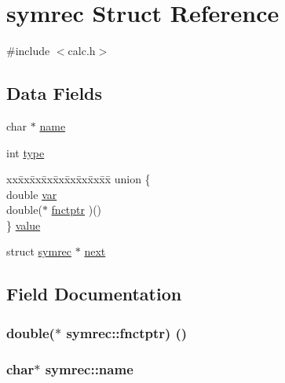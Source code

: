 \hypertarget{structsymrec}{}\section{symrec Struct Reference}
\label{structsymrec}


{\ttfamily \#include $<$calc.\+h$>$}

\subsection*{Data Fields}
\begin{DoxyCompactItemize}
\item 
char $\ast$ \hyperlink{structsymrec_a13b3ddedd56ed8a393dfd4b266bb81e1}{name}
\item 
int \hyperlink{structsymrec_a3ed0bae32ad0e16423a49153484094f8}{type}
\item 
\begin{tabbing}
xx\=xx\=xx\=xx\=xx\=xx\=xx\=xx\=xx\=\kill
union \{\\
\>double \hyperlink{structsymrec_af3db0c7e569f93a9d7385d5b170578f8}{var}\\
\>double($\ast$ \hyperlink{structsymrec_accae313254c71fad5d7eb0446473bec5}{fnctptr} )()\\
\} \hyperlink{structsymrec_aabe0b508928c6472fcbdf5071c33b61a}{value}\\

\end{tabbing}\item 
struct \hyperlink{structsymrec}{symrec} $\ast$ \hyperlink{structsymrec_a799aa9b5b3ee76aa0634b0ad96f80ea1}{next}
\end{DoxyCompactItemize}


\subsection{Field Documentation}
\hypertarget{structsymrec_accae313254c71fad5d7eb0446473bec5}{}
\subsubsection[{fnctptr}]{\setlength{\rightskip}{0pt plus 5cm}double($\ast$ symrec\+::fnctptr) ()}\label{structsymrec_accae313254c71fad5d7eb0446473bec5}
\hypertarget{structsymrec_a13b3ddedd56ed8a393dfd4b266bb81e1}{}
\subsubsection[{name}]{\setlength{\rightskip}{0pt plus 5cm}char$\ast$ symrec\+::name}\label{structsymrec_a13b3ddedd56ed8a393dfd4b266bb81e1}
\hypertarget{structsymrec_a799aa9b5b3ee76aa0634b0ad96f80ea1}{}
